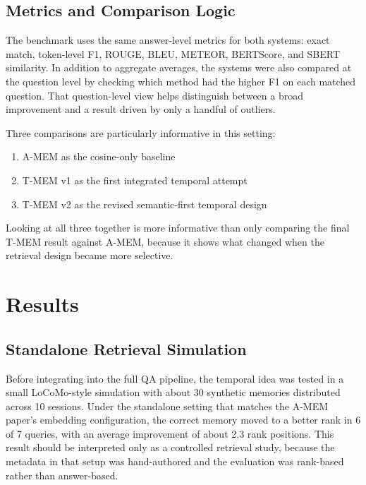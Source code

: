 \documentclass[conference]{IEEEtran}
\begin{document}
\subsection{Metrics and Comparison Logic}

The benchmark uses the same answer-level metrics for both systems: exact match, token-level F1, ROUGE, BLEU, METEOR, BERTScore, and SBERT similarity. In addition to aggregate averages, the systems were also compared at the question level by checking which method had the higher F1 on each matched question. That question-level view helps distinguish between a broad improvement and a result driven by only a handful of outliers.

Three comparisons are particularly informative in this setting:
\begin{enumerate}
    \item A-MEM as the cosine-only baseline
    \item T-MEM v1 as the first integrated temporal attempt
    \item T-MEM v2 as the revised semantic-first temporal design
\end{enumerate}

Looking at all three together is more informative than only comparing the final T-MEM result against A-MEM, because it shows what changed when the retrieval design became more selective.

\section{Results}

\subsection{Standalone Retrieval Simulation}

Before integrating into the full QA pipeline, the temporal idea was tested in a small LoCoMo-style simulation with about 30 synthetic memories distributed across 10 sessions. Under the standalone setting that matches the A-MEM paper's embedding configuration, the correct memory moved to a better rank in 6 of 7 queries, with an average improvement of about 2.3 rank positions. This result should be interpreted only as a controlled retrieval study, because the metadata in that setup was hand-authored and the evaluation was rank-based rather than answer-based.
\end{document}
